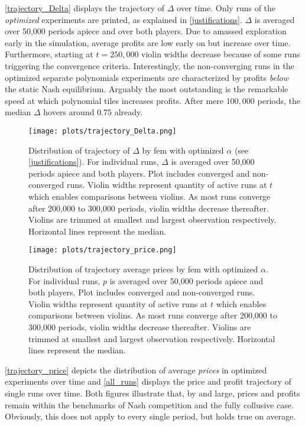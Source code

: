 \autoref{trajectory_Delta} displays the trajectory of $\Delta$ over time. Only runs of the \emph{optimized} experiments are printed, as explained in \autoref{justifications}. $\Delta$ is averaged over 50,000 periods apiece and over both players. Due to amassed exploration early in the simulation, average profits are low early on but increase over time. Furthermore, starting at $t = 250,000$ violin widths decrease because of some runs triggering the convergence criteria. Interestingly, the non-converging runs in the optimized separate polynomials experiments are characterized by profits \emph{below} the static Nash equilibrium. Arguably the most outstanding is the remarkable speed at which polynomial tiles increases profits. After mere $100,000$ periods, the median $\Delta$ hovers around $0.75$ already.




\begin{figure}
	\texttt{[image: plots/trajectory\_Delta.png]}
	\caption[Distribution of trajectory of $\Delta$ by \gls{fem}]{Distribution of trajectory of $\Delta$ by \gls{fem} with optimized $\alpha$ (see \autoref{justifications}). For individual runs, $\Delta$ is averaged over 50,000 periods apiece and both players. Plot includes converged and non-converged runs. Violin widths represent quantity of active runs at $t$ which enables comparisons between violins. As most runs converge after 200,000 to 300,000 periods, violin widths decrease thereafter. Violins are trimmed at smallest and largest observation respectively. Horizontal lines represent the median.}
	\label{trajectory_Delta}
\end{figure}

\begin{figure}
	\texttt{[image: plots/trajectory\_price.png]}
	\caption[Distribution of trajectory of average prices by \gls{fem}]{Distribution of trajectory average prices by \gls{fem} with optimized $\alpha$. For individual runs, $p$ is averaged over 50,000 periods apiece and both players. Plot includes converged and non-converged runs. Violin widths represent quantity of active runs at $t$ which enables comparisons between violins. As most runs converge after 200,000 to 300,000 periods, violin widths decrease thereafter. Violins are trimmed at smallest and largest observation respectively. Horizontal lines represent the median.}
	\label{trajectory_price}
\end{figure}

\autoref{trajectory_price} depicts the distribution of average \emph{prices} in optimized experiments over time and \autoref{all_runs} displays the price and profit trajectory of single runs over time. Both figures illustrate that, by and large, prices and profits remain within the benchmarks of Nash competition and the fully collusive case. Obviously, this does not apply to every single period, but holds true on average.
 

